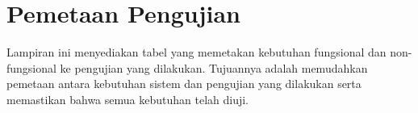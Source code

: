 \chapter{Pemetaan Pengujian}
\label{appendix:pemetaan-pengujian}

Lampiran ini menyediakan tabel yang memetakan kebutuhan fungsional dan non-fungsional ke pengujian yang dilakukan. Tujuannya adalah memudahkan pemetaan antara kebutuhan sistem dan pengujian yang dilakukan serta memastikan bahwa semua kebutuhan telah diuji.

\begin{table}
    \centering
    \caption{Perbandingan kakas in-memory key-value store}
    \label{tab:pemetaan-pengujian}
\end{table}